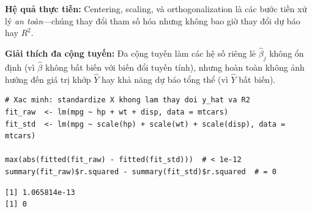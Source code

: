 \textbf{Hệ quả thực tiễn:} Centering, scaling, và orthogonalization là các bước tiền xử lý \textit{an toàn}---chúng thay đổi tham số hóa nhưng không bao giờ thay đổi dự báo hay $R^2$.

\textbf{Giải thích đa cộng tuyến:} Đa cộng tuyến làm các hệ số riêng lẻ $\hat{\beta}_j$ không ổn định (vì $\hat{\beta}$ không bất biến với biến đổi tuyến tính), nhưng hoàn toàn không ảnh hưởng đến giá trị khớp $\hat{Y}$ hay khả năng dự báo tổng thể (vì $\hat{Y}$ bất biến).

\begin{lstlisting}[style=Rstyle]
# Xac minh: standardize X khong lam thay doi y_hat va R2
fit_raw  <- lm(mpg ~ hp + wt + disp, data = mtcars)
fit_std  <- lm(mpg ~ scale(hp) + scale(wt) + scale(disp), data = mtcars)

max(abs(fitted(fit_raw) - fitted(fit_std)))  # < 1e-12
summary(fit_raw)$r.squared - summary(fit_std)$r.squared  # = 0
\end{lstlisting}

\begin{lstlisting}[style=output]
[1] 1.065814e-13
[1] 0
\end{lstlisting}

